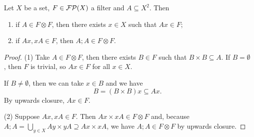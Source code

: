 \begin{lemma} \label{principalImageOfInProductFilter}
Let $X$ be a set, $F\in \operatorname{\mathcal{FP}}(X)$ a filter and $A\subseteq X^2$. Then
\begin{enumerate}
\item if $A\in F\otimes F$, then there exists $x\in X$ such that $Ax\in F$;
\item if $Ax, xA\in F$, then $A;A \in F\otimes F$.
\end{enumerate}
\end{lemma}
\begin{proof}
(1) Take $A\in F\otimes F$, then there exists $B\in F$ such that $B\times B\subseteq A$. If $B = \emptyset$, then $F$ is trivial, so $Ax\in F$ for all $x\in X$.

If $B \neq \emptyset$, then we can take $x\in B$ and we have
\[ B = (B\times B)x \subseteq Ax. \]
By upwards closure, $Ax\in F$.

(2) Suppose $Ax, xA\in F$. Then $Ax\times xA \in F\otimes F$ and, because $A;A = \bigcup_{y\in X}Ay\times yA \supseteq Ax\times xA$, we have $A;A\in F\otimes F$ by upwards closure.
\end{proof}

